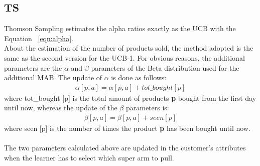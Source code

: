 \subsection{TS}
Thomson Sampling estimates the alpha ratios exactly as the UCB with the Equation ~\ref{eqn:alpha}.\\About the estimation of the number of products sold, the method adopted is the same as the second version for the UCB-1. For obvious reasons, the additional parameters are the $\alpha$ and $\beta$ parameters of the Beta distribution used for the additional MAB. The update of $\alpha$ is done as follows:
\begin{align*}
    \alpha[p, a] = \alpha[p, a] + tot\_bought[p]
\end{align*}
where tot\_bought [p] is the total amount of products {\bf p} bought from the first day until now, whereas the update of the $\beta$ parameters is:
\begin{align*}
    \beta[p, a] = \beta [p, a] + seen[p]
\end{align*}
where seen [p] is the number of times the product {\bf p} has been bought until now.\\\\
The two parameters calculated above are updated in the customer's attributes when the learner has to select which super arm to pull.\\

